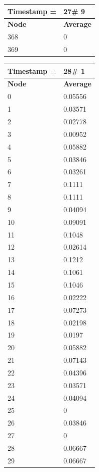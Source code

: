 \begin{tabular}{|l||l|}
\hline
\textbf{Timestamp =} & \textbf{27}\# 9\\\hline
	\textbf{Node} & \textbf{Average} \\ \hline
\hline
	368 & 0 \\ \hline
	369 & 0 \\ \hline
\end{tabular}

\begin{tabular}{|l||l|}
\hline
\textbf{Timestamp =} & \textbf{28}\# 1\\\hline
	\textbf{Node} & \textbf{Average} \\ \hline
\hline
	0 & 0.05556 \\ \hline
	1 & 0.03571 \\ \hline
	2 & 0.02778 \\ \hline
	3 & 0.00952 \\ \hline
	4 & 0.05882 \\ \hline
	5 & 0.03846 \\ \hline
	6 & 0.03261 \\ \hline
	7 & 0.1111 \\ \hline
	8 & 0.1111 \\ \hline
	9 & 0.04094 \\ \hline
	10 & 0.09091 \\ \hline
	11 & 0.1048 \\ \hline
	12 & 0.02614 \\ \hline
	13 & 0.1212 \\ \hline
	14 & 0.1061 \\ \hline
	15 & 0.1046 \\ \hline
	16 & 0.02222 \\ \hline
	17 & 0.07273 \\ \hline
	18 & 0.02198 \\ \hline
	19 & 0.0197 \\ \hline
	20 & 0.05882 \\ \hline
	21 & 0.07143 \\ \hline
	22 & 0.04396 \\ \hline
	23 & 0.03571 \\ \hline
	24 & 0.04094 \\ \hline
	25 & 0 \\ \hline
	26 & 0.03846 \\ \hline
	27 & 0 \\ \hline
	28 & 0.06667 \\ \hline
	29 & 0.06667 \\ \hline

\end{tabular}
